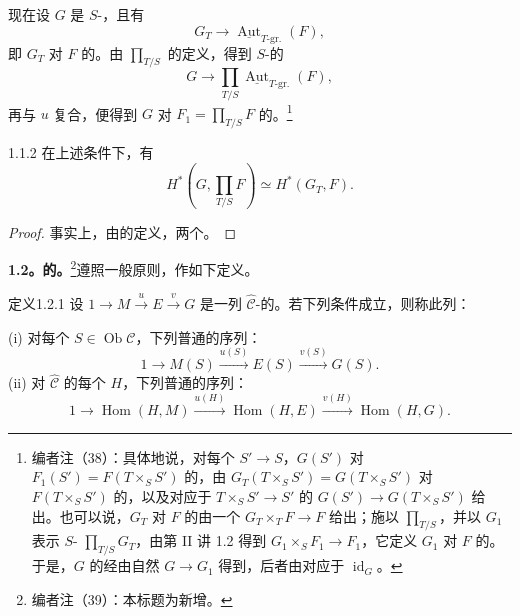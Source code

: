 现在设 $G$ 是 $S$-，且有
\[
 G_T\longrightarrow\underline{\operatorname{Aut}}_{T\text{-gr.}}(F),
\]
即 $G_T$ 对 $F$ 的。由 $\prod_{T/S}$ 的定义，得到 $S$-的
\[
 G\longrightarrow\prod_{T/S}\underline{\operatorname{Aut}}_{T\text{-gr.}}(F),
\]
再与 $u$ 复合，便得到 $G$ 对 $F_1=\prod_{T/S}F$ 的。\footnote{编者注（38）：具体地说，对每个 $S'\to S$，$G(S')$ 对 $F_1(S')=F(T\times_S S')$ 的，由 $G_T(T\times_S S')=G(T\times_S S')$ 对 $F(T\times_S S')$ 的，以及对应于 $T\times_S S'\to S'$ 的 $G(S')\to G(T\times_S S')$ 给出。也可以说，$G_T$ 对 $F$ 的由一个 $G_T\times_T F\to F$ 给出；施以 $\prod_{T/S}$，并以 $G_1$ 表示 $S$- $\prod_{T/S}G_T$，由第 II 讲 1.2 得到 $G_1\times_S F_1\to F_1$，它定义 $G_1$ 对 $F$ 的。于是，$G$ 的经由自然 $G\to G_1$ 得到，后者由对应于 $\operatorname{id}_G$。}
\begin{SGAresult}{}{1.1.2}
在上述条件下，有
\[
 H^*\left(G,\prod_{T/S}F\right)\simeq H^*(G_T,F).
\]
\end{SGAresult}
\begin{proof}
事实上，由的定义，两个。
\end{proof}
\textbf{1.2。的。}\footnote{编者注（39）：本标题为新增。}遵照一般原则，作如下定义。
\begin{SGAresult}{定义}{1.2.1}
设 $1\to M\xrightarrow{u}E\xrightarrow{v}G$ 是一列 $\widehat{\mathcal C}$-的。若下列条件成立，则称此列：

(i) 对每个 $S\in\operatorname{Ob}\mathcal C$，下列普通的序列：
\[
 1\longrightarrow M(S)\xrightarrow{u(S)}E(S)\xrightarrow{v(S)}G(S).
\]
(ii) 对 $\widehat{\mathcal C}$ 的每个 $H$，下列普通的序列：
\[
 1\longrightarrow\operatorname{Hom}(H,M)\xrightarrow{u(H)}
 \operatorname{Hom}(H,E)\xrightarrow{v(H)}\operatorname{Hom}(H,G).
\]
\end{SGAresult}
